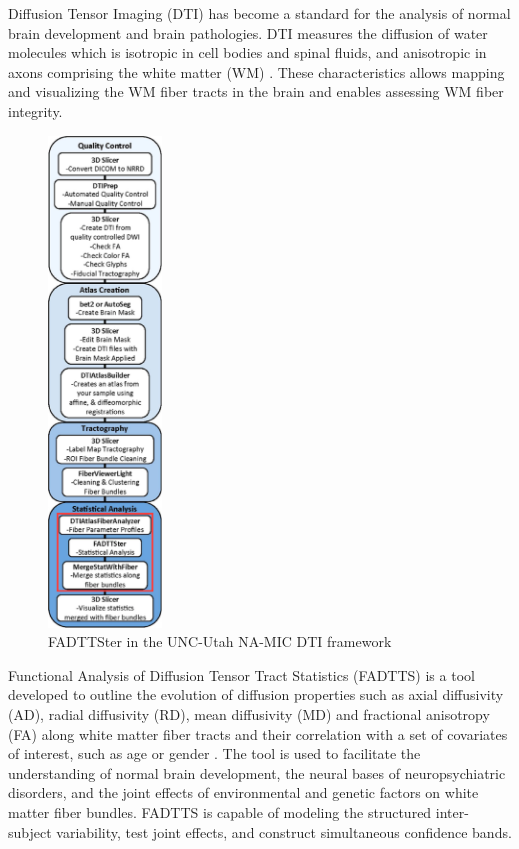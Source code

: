 \documentclass[]{spie}  %
\begin{document}
Diffusion Tensor Imaging (DTI) has become a standard for the analysis of normal brain development and brain pathologies.
DTI measures the diffusion of water molecules which is isotropic in cell bodies and spinal fluids, and anisotropic 
in axons comprising the white matter (WM) \cite{feldman2010diffusion}. 
These characteristics allows mapping and visualizing the WM fiber tracts in the brain \cite{dti_brain_mapping1_article,dti_brain_mapping2_article} and enables assessing WM fiber integrity.

\begin{figure}
	\includegraphics[width=0.27\textwidth]{namicFrameworkOut.eps}
	\caption[NA-MIC framework]{FADTTSter in the UNC-Utah NA-MIC DTI framework}
	\label{fig:namicFramework}  
	\vspace{-60pt}
\end{figure}

Functional Analysis of Diffusion Tensor Tract Statistics (FADTTS) is a tool developed to outline the evolution of diffusion properties such as axial diffusivity (AD), radial diffusivity (RD), mean diffusivity (MD) and fractional anisotropy (FA) along white matter fiber tracts and their correlation with a set of covariates of interest, such as age or gender \cite{fadtts_article}. The tool is used to facilitate the understanding of normal brain development, the neural bases of neuropsychiatric disorders, and the joint effects of environmental and genetic factors on white matter fiber bundles. 
FADTTS is capable of modeling the structured inter-subject variability, test joint effects, and construct simultaneous confidence bands. 
\end{document}

